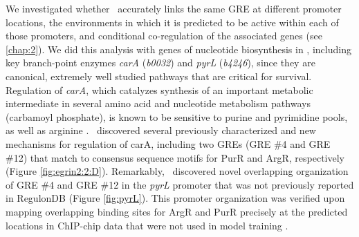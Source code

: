 We investigated whether \egrine~accurately links the same GRE at different promoter locations, the environments in which it is predicted to be active within each of those promoters, and conditional co-regulation of the associated genes (see \ref{chap:2}). We did this analysis with genes of nucleotide biosynthesis in \eco, including key branch-point enzymes \textit{carA} (\textit{b0032}) and \textit{pyrL} (\textit{b4246}), since they are canonical, extremely well studied pathways that are critical for survival. Regulation of \textit{carA}, which catalyzes synthesis of an important metabolic intermediate in several amino acid and nucleotide metabolism pathways (carbamoyl phosphate), is known to be sensitive to purine and pyrimidine pools, as well as arginine \cite{neidhardt_escherichia_1996}. \egrine~discovered several previously characterized and new mechanisms for regulation of carA, including two GREs (GRE \#4 and GRE \#12) that match to consensus sequence motifs for PurR and ArgR, respectively \cite{piette_dna_1984} (Figure \ref{fig:egrin2:2:D}). Remarkably, \egrine~discovered novel overlapping organization of GRE \#4 and GRE \#12 in the \textit{pyrL} promoter that was not previously reported in RegulonDB (Figure \ref{fig:pyrL}). This promoter organization was verified upon mapping overlapping binding sites for ArgR and PurR precisely at the predicted locations in ChIP-chip data that were not used in model training \cite{cho_deciphering_2012,cho_purr_2011}.

